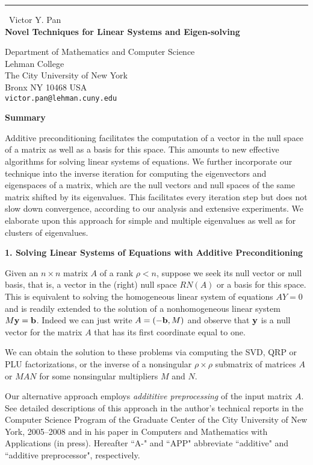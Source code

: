 \documentclass{report}
\begin{document}
\begin{center}
\rule{6in}{1pt} \
{\large Victor Y. Pan \\
{\bf Novel Techniques for Linear Systems and Eigen-solving}}

Department of Mathematics and Computer Science \\ Lehman College \\ The City University of New York \\ Bronx NY 10468 USA
\\
{\tt victor.pan@lehman.cuny.edu}\end{center}

\noindent
{\bf Summary}

Additive preconditioning facilitates the computation of a vector in the
null space of a matrix as well as a basis for this space. This amounts to
new effective algorithms for solving linear systems of equations. We
further incorporate our technique into the inverse iteration for
computing the eigenvectors and eigenspaces of a matrix, which are the
null vectors and null spaces of the same matrix shifted by its
eigenvalues. This facilitates every iteration step but does not slow down
convergence, according to our analysis and extensive experiments.
We elaborate upon this approach for simple and multiple eigenvalues as
well as for clusters of eigenvalues.

\noindent
{\bf 1. Solving Linear Systems of Equations with Additive Preconditioning}

Given an $n \times n$ matrix $A$ of a rank $\rho<n$, suppose we seek its
null vector or null basis, that is, a vector in the (right) null space
$RN(A)$ or a basis for this space. This is equivalent to solving the
homogeneous linear system of equations $AY=0$ and is readily extended to
the solution of a nonhomogeneous linear system $M{\bf y}={\bf b}$. Indeed
we can just write $A=(-{\bf b},M)$ and observe that ${\bf y}$ is a null
vector for the matrix $A$ that has its first coordinate equal to one.

We can obtain the solution to these problems via computing the SVD, QRP
or PLU factorizations, or the inverse of a nonsingular $\rho \times \rho$
submatrix of matrices $A$ or $MAN$ for some
nonsingular multipliers $M$ and $N$.

Our alternative approach employs {\em addititive preprocessing} of the
input matrix $A$. See detailed descriptions of this approach in the
author's technical reports in the Computer Science Program of the
Graduate Center of the City University of New York, 2005--2008 and in his
paper in Computers and Mathematics with Applications (in press).
Hereafter ``A-" and ``APP" abbreviate ``additive" and ``additive
preprocessor", respectively.
\end{document}
